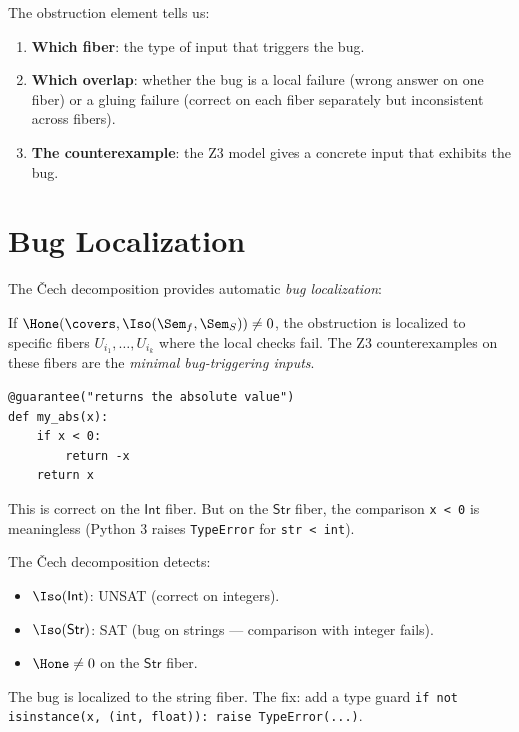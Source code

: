 The obstruction element tells us:
\begin{enumerate}
  \item \textbf{Which fiber}: the type of input that triggers the bug.
  \item \textbf{Which overlap}: whether the bug is a local failure
    (wrong answer on one fiber) or a gluing failure (correct on each
    fiber separately but inconsistent across fibers).
  \item \textbf{The counterexample}: the Z3 model gives a concrete
    input that exhibits the bug.
\end{enumerate}

\section{Bug Localization}

The \v{C}ech decomposition provides automatic \emph{bug localization}:

\begin{theorem}
If $\Hone(\covers, \Iso(\Sem_f, \Sem_S)) \neq 0$, the obstruction
is localized to specific fibers $U_{i_1}, \ldots, U_{i_k}$ where
the local checks fail.  The Z3 counterexamples on these fibers are
the \emph{minimal bug-triggering inputs}.
\end{theorem}

\begin{example}
\begin{lstlisting}
@guarantee("returns the absolute value")
def my_abs(x):
    if x < 0:
        return -x
    return x
\end{lstlisting}

This is correct on the $\mathsf{Int}$ fiber.  But on the
$\mathsf{Str}$ fiber, the comparison \texttt{x < 0} is meaningless
(Python 3 raises \texttt{TypeError} for \texttt{str < int}).

The \v{C}ech decomposition detects:
\begin{itemize}
  \item $\Iso(\mathsf{Int})$: UNSAT (correct on integers).
  \item $\Iso(\mathsf{Str})$: SAT (bug on strings --- comparison
    with integer fails).
  \item $\Hone \neq 0$ on the $\mathsf{Str}$ fiber.
\end{itemize}

The bug is localized to the string fiber.  The fix: add a type guard
\texttt{if not isinstance(x, (int, float)): raise TypeError(...)}.
\end{example}

